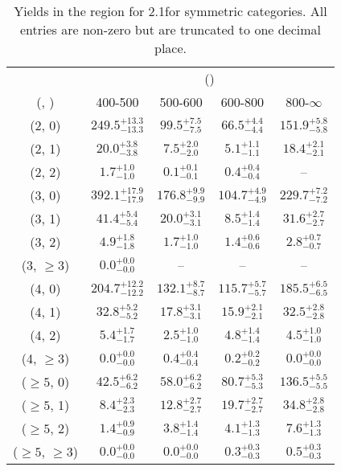 \begin{table}[h!]
\tiny
\centering
\caption{Yields in the \gj region for 2.1\ifb for symmetric categories. All entries are non-zero but are truncated to one decimal place.\label{tab:yieldsnodata_gj_comb_sym}}
\begin{tabular}
{ccccc}
	\hline\hline
	& \multicolumn{4}{c}{\scalht (\gev)} \\ 
	 (\njet,  \nb) & 400-500 & 500-600 & 600-800 & 800-$\infty$ \\ [0.8ex] 
\hline
	(2, 0) & $249.5^{+ 13.3 }_{- 13.3 }$ & $99.5^{+ 7.5 }_{- 7.5 }$ & $66.5^{+ 4.4 }_{- 4.4 }$ & $151.9^{+ 5.8 }_{- 5.8 }$ \\[0.5ex] 
	(2, 1) & $20.0^{+ 3.8 }_{- 3.8 }$ & $7.5^{+ 2.0 }_{- 2.0 }$ & $5.1^{+ 1.1 }_{- 1.1 }$ & $18.4^{+ 2.1 }_{- 2.1 }$ \\[0.5ex] 
	(2, 2) & $1.7^{+ 1.0 }_{- 1.0 }$ & $0.1^{+ 0.1 }_{- 0.1 }$ & $0.4^{+ 0.4 }_{- 0.4 }$ & -- \\[0.5ex] 
	(3, 0) & $392.1^{+ 17.9 }_{- 17.9 }$ & $176.8^{+ 9.9 }_{- 9.9 }$ & $104.7^{+ 4.9 }_{- 4.9 }$ & $229.7^{+ 7.2 }_{- 7.2 }$ \\[0.5ex] 
	(3, 1) & $41.4^{+ 5.4 }_{- 5.4 }$ & $20.0^{+ 3.1 }_{- 3.1 }$ & $8.5^{+ 1.4 }_{- 1.4 }$ & $31.6^{+ 2.7 }_{- 2.7 }$ \\[0.5ex] 
	(3, 2) & $4.9^{+ 1.8 }_{- 1.8 }$ & $1.7^{+ 1.0 }_{- 1.0 }$ & $1.4^{+ 0.6 }_{- 0.6 }$ & $2.8^{+ 0.7 }_{- 0.7 }$ \\[0.5ex] 
	(3, $\ge3$) & $0.0^{+ 0.0 }_{- 0.0 }$ & -- & -- & -- \\[0.5ex] 
	(4, 0) & $204.7^{+ 12.2 }_{- 12.2 }$ & $132.1^{+ 8.7 }_{- 8.7 }$ & $115.7^{+ 5.7 }_{- 5.7 }$ & $185.5^{+ 6.5 }_{- 6.5 }$ \\[0.5ex] 
	(4, 1) & $32.8^{+ 5.2 }_{- 5.2 }$ & $17.8^{+ 3.1 }_{- 3.1 }$ & $15.9^{+ 2.1 }_{- 2.1 }$ & $32.5^{+ 2.8 }_{- 2.8 }$ \\[0.5ex] 
	(4, 2) & $5.4^{+ 1.7 }_{- 1.7 }$ & $2.5^{+ 1.0 }_{- 1.0 }$ & $4.8^{+ 1.4 }_{- 1.4 }$ & $4.5^{+ 1.0 }_{- 1.0 }$ \\[0.5ex] 
	(4, $\ge3$) & $0.0^{+ 0.0 }_{- 0.0 }$ & $0.4^{+ 0.4 }_{- 0.4 }$ & $0.2^{+ 0.2 }_{- 0.2 }$ & $0.0^{+ 0.0 }_{- 0.0 }$ \\[0.5ex] 
	($\ge5$, 0) & $42.5^{+ 6.2 }_{- 6.2 }$ & $58.0^{+ 6.2 }_{- 6.2 }$ & $80.7^{+ 5.3 }_{- 5.3 }$ & $136.5^{+ 5.5 }_{- 5.5 }$ \\[0.5ex] 
	($\ge5$, 1) & $8.4^{+ 2.3 }_{- 2.3 }$ & $12.8^{+ 2.7 }_{- 2.7 }$ & $19.7^{+ 2.7 }_{- 2.7 }$ & $34.8^{+ 2.8 }_{- 2.8 }$ \\[0.5ex] 
	($\ge5$, 2) & $1.4^{+ 0.9 }_{- 0.9 }$ & $3.8^{+ 1.4 }_{- 1.4 }$ & $4.1^{+ 1.3 }_{- 1.3 }$ & $7.6^{+ 1.3 }_{- 1.3 }$ \\[0.5ex] 
	($\ge5$, $\ge3$) & $0.0^{+ 0.0 }_{- 0.0 }$ & $0.0^{+ 0.0 }_{- 0.0 }$ & $0.3^{+ 0.3 }_{- 0.3 }$ & $0.5^{+ 0.3 }_{- 0.3 }$ \\[0.5ex] 
	\hline
	\hline
\end{tabular}
\end{table}
